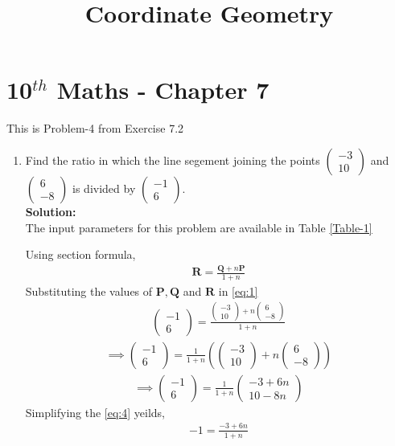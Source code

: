 \documentclass[12pt]{article}
\providecommand{\brak}[1]{\ensuremath{\left(#1\right)}}
\newcommand{\solution}{\noindent \textbf{Solution: }}
\newcommand{\myvec}[1]{\ensuremath{\begin{pmatrix}#1\end{pmatrix}}}
\let\vec\mathbf
\begin{document}
\begin{center}
\title{\textbf{Coordinate Geometry}}
\date{\vspace{-5ex}} %
\maketitle
\end{center}
\setcounter{page}{1}
\section*{10$^{th}$ Maths - Chapter 7}
This is Problem-4 from Exercise 7.2
\begin{enumerate}
\item Find the ratio in which the line segement joining the points $\myvec{-3 \\ 10}$ and $\myvec{6\\-8}$ is divided by $\myvec{-1\\6}$.\\
\solution \\The input parameters for this problem are available in Table \eqref{Table-1}
\begin{table}[ht!]

\caption{}
\label{Table-1} 
\end{table}
Using section formula,
\begin{align}
         \vec{R}=\frac{\vec{Q}+n\vec{P}}{1+n}\label{eq:1}
\end{align}
Substituting the values of $\vec{P},\vec{Q}$ and $\vec{R}$ in \eqref{eq:1}
\begin{align}
         \myvec{-1\\6}=\frac{{\myvec{-3\\10}+n\myvec{6\\-8}}}{1+n}
\end{align}
\begin{align}
         \implies \myvec{-1\\6}=\frac{1}{1+n}\brak{{\myvec{-3\\10}+n\myvec{6\\-8}}} 
         \end{align}
\begin{align}
         \implies \myvec{-1\\6}=\frac{1}{1+n}\myvec{-3+6n\\10-8n} \label{eq:4}
\end{align}
Simplifying the \eqref{eq:4} yeilds,
\begin{multline}
          -1=\frac{-3+6n}{1+n}\\

\end{multline}
\end{enumerate}
\end{document}
